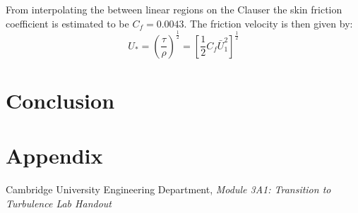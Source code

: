 \documentclass{article}
\begin{document}




From interpolating the between linear regions on the Clauser the skin friction coefficient is estimated to be $C_f = 0.0043$.
The friction velocity is then given by:
\begin{equation}
    U_* = \left( \frac{\tau}{\rho} \right)^{\frac{1}{2}} = \left[ \frac{1}{2}C_f \bar{ U}_1^2 \right]^{\frac{1}{2}}
\end{equation}




\section{Conclusion}



\section{Appendix}

\begin{thebibliography}{9}
    Cambridge University Engineering Department, \textit{Module 3A1: Transition to Turbulence Lab Handout}
\end{thebibliography}
\end{document}
